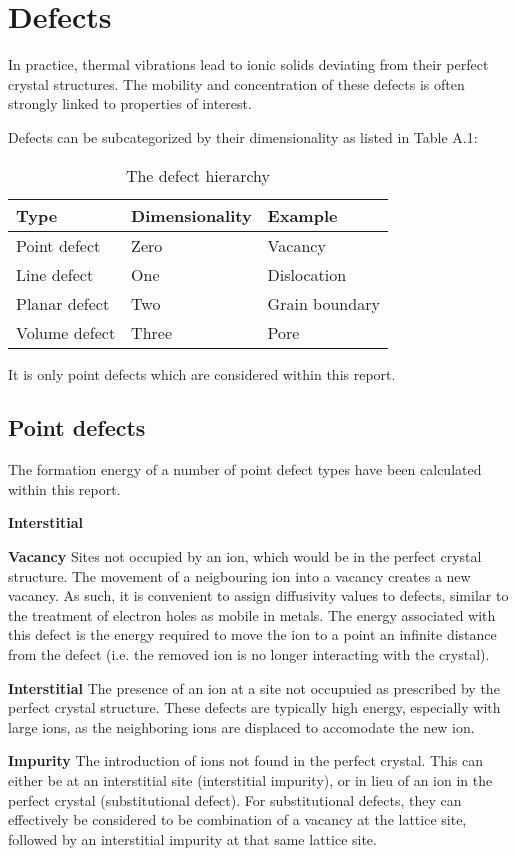 \appendix
\chapter{Defects}
In practice, thermal vibrations lead to ionic solids deviating from their perfect crystal structures. 
The mobility and concentration of these defects is often strongly linked to properties of interest.

Defects can be subcategorized by their dimensionality as listed in Table A.1:

\begin{table}[bh!]
\centering
\label{tab:defecthierarchy}
\caption{The defect hierarchy \citep{Carter2013}}
\begin{tabular}{@{}lll@{}}
\toprule
Type            & Dimensionality  & Example\\
\midrule
Point defect    & Zero            & Vacancy\\
Line defect     & One             & Dislocation\\
Planar defect   & Two             & Grain boundary\\
Volume defect   & Three           & Pore\\
\bottomrule
\end{tabular}
\end{table}

It is only point defects which are considered within this report.
\newpage
\section{Point defects}
The formation energy of a number of point defect types have been calculated within this report.


\begin{labeling}{\textbf{Interstitial}}
\item[\textbf{Vacancy}] Sites not occupied by an ion, which would be in the perfect crystal structure. The movement of a neigbouring ion into a vacancy creates a new vacancy. As such, it is convenient to assign diffusivity values to defects, similar to the treatment of electron holes as mobile in metals. The energy associated with this defect is the energy required to move the ion to a point an infinite distance from the defect (i.e. the removed ion is no longer interacting with the crystal).

\item[\textbf{Interstitial}] The presence of an ion at a site not occupuied as prescribed by the perfect crystal structure. These defects are typically high energy, especially with large ions, as the neighboring ions are displaced to accomodate the new ion.
\item[\textbf{Impurity}] The introduction of ions not found in the perfect crystal. This can either be at an interstitial site (interstitial impurity), or in lieu of an ion in the perfect crystal (substitutional defect).
For substitutional defects, they can effectively be considered to be combination of a vacancy at the lattice site, followed by an interstitial impurity at that same lattice site.
\end{labeling}

